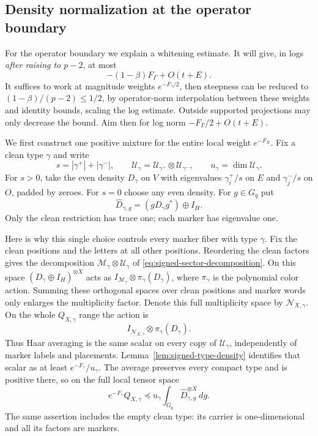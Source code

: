 \subsection{Density normalization at the operator boundary}
For the operator boundary we explain a whitening estimate. It will give, in logs \emph{after raising to \(p-2\)}, at most
\begin{equation}
                  -(1-\beta) F_\Gamma + O(t+E).                            \label{ten:lowering:eq:10}
\end{equation}
It suffices to work at magnitude weights \(e^{-F_\gamma/2}\), then steepness can be reduced to \((1-\beta)/(p-2)\le1/2\), by operator-norm interpolation between these weights and identity bounds, scaling the log estimate. Outside supported projections may only decrease the bound. Aim then for log norm \(-F_\Gamma/2+O(t+E)\).

We first construct one positive mixture for the entire local weight
$e^{-F_X}$. Fix a clean type $\gamma$ and write
\[
 s=|\gamma^+|+|\gamma^-|,\qquad
 \mathcal U_\gamma=\mathcal U_{\gamma^+}\otimes\mathcal U_{\gamma^-},
 \qquad u_\gamma=\dim\mathcal U_\gamma.
\]
For $s>0$, take the even density $D_\gamma$ on $V$ with eigenvalues
$\gamma_i^+/s$ on $E$ and $\gamma_j^-/s$ on $O$, padded by zeroes.
For $s=0$ choose any even density. For $g\in G_q$ put
\[
 \widehat D_{\gamma,g}=(gD_\gamma g^*)\oplus I_H.
\]
Only the clean restriction has trace one; each marker has eigenvalue
one.

Here is why this single choice controls every marker fiber with type
$\gamma$. Fix the clean positions and the letters at all other
positions. Reordering the clean factors gives the decomposition
$\mathcal M_\gamma\otimes\mathcal U_\gamma$ of
\eqref{eq:signed-sector-decomposition}. On this space
$(D_\gamma\oplus I_H)^{\otimes X}$ acts as
$I_{\mathcal M_\gamma}\otimes\pi_\gamma(D_\gamma)$, where
$\pi_\gamma$ is the polynomial color action. Summing these orthogonal
spaces over clean positions and marker words only enlarges the
multiplicity factor. Denote this full multiplicity space by
$\mathcal N_{X,\gamma}$. On the whole $Q_{X,\gamma}$ range the action is
\[
 I_{\mathcal N_{X,\gamma}}\otimes\pi_\gamma(D_\gamma).
\]
Thus Haar averaging is the same scalar on every copy of
$\mathcal U_\gamma$, independently of marker labels and placements.
Lemma~\ref{lem:signed-type-density} identifies that scalar as at least
$e^{-F_\gamma}/u_\gamma$. The average preserves every compact type
and is positive there, so on the full local tensor space
\[
 e^{-F_\gamma}Q_{X,\gamma}\preceq
 u_\gamma\int_{G_q}\widehat D_{\gamma,g}^{\otimes X}\,dg.
\]
The same assertion includes the empty clean type: its carrier is
one-dimensional and all its factors are markers.

